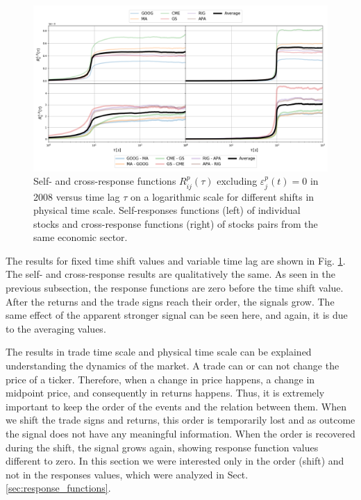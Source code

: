 \begin{figure}[htbp]
    \centering
    \includegraphics[width=\textwidth]{figures/04_shift_responses_physical.png}
    \caption{Self- and cross-response functions $R^{p}_{ij}\left(\tau\right)$
             excluding $\varepsilon^{p}_{j}\left(t\right) = 0$ in 2008 versus
             time lag $\tau$ on a logarithmic scale for different shifts in
             physical time scale. Self-responses functions (left) of individual
             stocks and cross-response functions (right) of stocks pairs from
             the same economic sector.}
    \label{fig:shift_responses_physical_scale}
\end{figure}

The results for fixed time shift values and variable time lag are shown in Fig.
\ref{fig:shift_responses_physical_scale}. The self- and cross-response results
are qualitatively the same. As seen in the previous subsection, the response
functions are zero before the time shift value. After the returns and the trade
signs reach their order, the signals grow. The same effect of the apparent
stronger signal can be seen here, and again, it is due to the averaging values.

The results in trade time scale and physical time scale can be explained
understanding the dynamics of the market. A trade can or can not change the
price of a ticker. Therefore, when a change in price happens, a change in
midpoint price, and consequently in returns happens. Thus, it is extremely
important to keep the order of the events and the relation between them. When
we shift the trade signs and returns, this order is temporarily lost and as
outcome the signal does not have any meaningful information. When the order is
recovered during the shift, the signal grows again, showing response function
values different to zero. In this section we were interested only in the order
(shift) and not in the responses values, which were analyzed in Sect.
\ref{sec:response_functions}.

